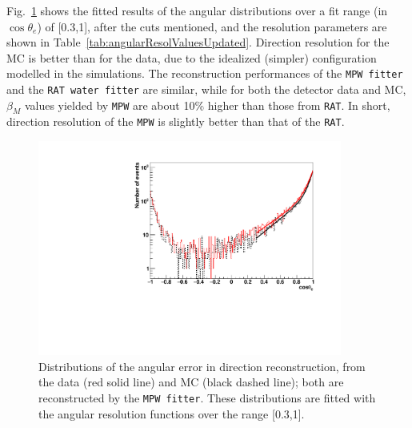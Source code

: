 Fig.~\ref{angularResolMPW} shows the fitted results of the angular distributions over a fit range (in $\cos \theta_e$) of [0.3,1], after the cuts mentioned, and the resolution parameters are shown in Table~\ref{tab:angularResolValuesUpdated}. Direction resolution for the MC is better than for the data, due to the idealized (simpler) configuration modelled in the simulations. The reconstruction performances of the \texttt{MPW fitter} and the \texttt{RAT water fitter} are similar, while for both the detector data and MC, $\beta_M$ values yielded by \texttt{MPW} are about 10\% higher than those from \texttt{RAT}. In short, direction resolution of the \texttt{MPW} is slightly better than that of the \texttt{RAT}.

\begin{figure}
	\centering
	\includegraphics[width=10cm]{16NangularResol.pdf}
	\caption[Distributions of the angular error in direction reconstruction, from the data and from MC.]{Distributions of the angular error in direction reconstruction, from the data (red solid line) and MC (black dashed line); both are reconstructed by the \texttt{MPW fitter}. These distributions are fitted with the angular resolution functions over the range [0.3,1].\label{angularResolMPW}}

\end{figure}

